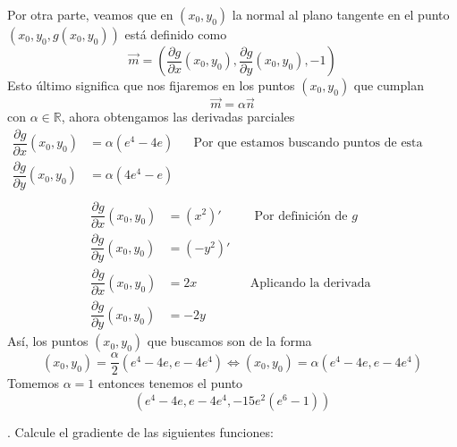 \documentclass[letterpaper]{article}
\renewcommand{\d}{\partial}
\newcommand{\R}{\mathds{R}}
\renewcommand{\*}{\cdot}
\theoremstyle{definition}
\begin{document}
Por otra parte, veamos que en $ (x_0,y_0) $ la normal al plano tangente en el punto $ (x_0,y_0,g(x_0,y_0)) $ está definido como 
\[ \vec{m} = \left( \dfrac{\d g}{\d x}(x_0, y_0), \dfrac{\d g}{\d y}(x_0,y_0),-1 \right) \]
Esto último significa que nos fijaremos en los puntos $ (x_0,y_0) $ que cumplan \[ \vec{m} = \alpha\vec{n} \] con $ \alpha \in \R $, ahora obtengamos las derivadas parciales 
\begin{align*}
	\dfrac{\d g}{\d x}(x_0, y_0) &= \alpha(e^4-4e) && \text{Por  que estamos buscando puntos de esta forma}\\
	\dfrac{\d g}{\d y}(x_0, y_0) &= \alpha(4e^4-e) && \text{ }\\
\end{align*}
\begin{align*}
	\dfrac{\d g}{\d x}(x_0, y_0) &= (x^2)' && \text{ Por definición de }g\\
	\dfrac{\d g}{\d y}(x_0, y_0) &= (-y^2)' && \text{ }\\
	\dfrac{\d g}{\d x}(x_0, y_0) &= 2x && \text{Aplicando la derivada }\\
	\dfrac{\d g}{\d y}(x_0, y_0) &= -2y && \text{ }
\end{align*}
Así, los puntos $ (x_0,y_0) $ que buscamos son de la forma 
\[ (x_0,y_0) = \dfrac{\alpha}{2}(e^4-4e,e-4e^4) \iff (x_0,y_0) = \alpha(e^4-4e,e-4e^4) \]
Tomemos $ \alpha = 1 $ entonces tenemos el punto
\[ (e^4-4e,e-4e^4, -15e^2(e^6-1) ) \]

.  Calcule el gradiente de las siguientes funciones:\\
\end{document}
